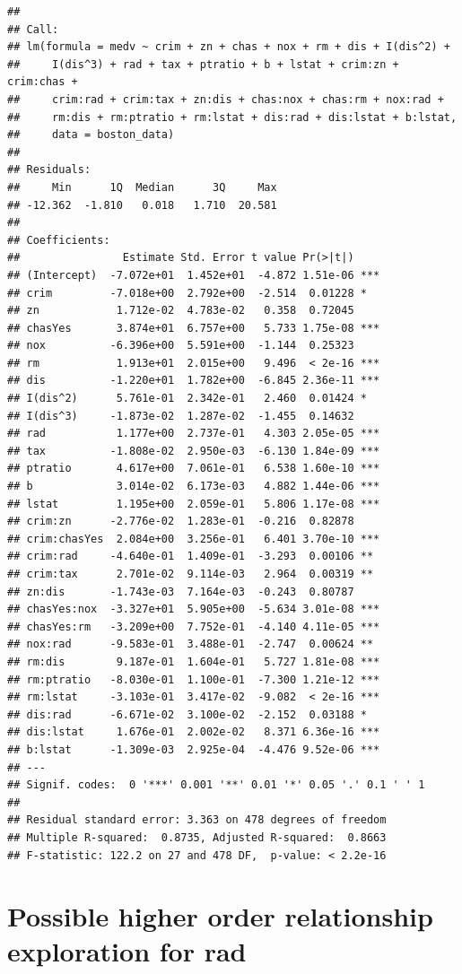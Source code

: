 \documentclass[
]{article}
\begin{document}
\begin{verbatim}
## 
## Call:
## lm(formula = medv ~ crim + zn + chas + nox + rm + dis + I(dis^2) + 
##     I(dis^3) + rad + tax + ptratio + b + lstat + crim:zn + crim:chas + 
##     crim:rad + crim:tax + zn:dis + chas:nox + chas:rm + nox:rad + 
##     rm:dis + rm:ptratio + rm:lstat + dis:rad + dis:lstat + b:lstat, 
##     data = boston_data)
## 
## Residuals:
##     Min      1Q  Median      3Q     Max 
## -12.362  -1.810   0.018   1.710  20.581 
## 
## Coefficients:
##                Estimate Std. Error t value Pr(>|t|)    
## (Intercept)  -7.072e+01  1.452e+01  -4.872 1.51e-06 ***
## crim         -7.018e+00  2.792e+00  -2.514  0.01228 *  
## zn            1.712e-02  4.783e-02   0.358  0.72045    
## chasYes       3.874e+01  6.757e+00   5.733 1.75e-08 ***
## nox          -6.396e+00  5.591e+00  -1.144  0.25323    
## rm            1.913e+01  2.015e+00   9.496  < 2e-16 ***
## dis          -1.220e+01  1.782e+00  -6.845 2.36e-11 ***
## I(dis^2)      5.761e-01  2.342e-01   2.460  0.01424 *  
## I(dis^3)     -1.873e-02  1.287e-02  -1.455  0.14632    
## rad           1.177e+00  2.737e-01   4.303 2.05e-05 ***
## tax          -1.808e-02  2.950e-03  -6.130 1.84e-09 ***
## ptratio       4.617e+00  7.061e-01   6.538 1.60e-10 ***
## b             3.014e-02  6.173e-03   4.882 1.44e-06 ***
## lstat         1.195e+00  2.059e-01   5.806 1.17e-08 ***
## crim:zn      -2.776e-02  1.283e-01  -0.216  0.82878    
## crim:chasYes  2.084e+00  3.256e-01   6.401 3.70e-10 ***
## crim:rad     -4.640e-01  1.409e-01  -3.293  0.00106 ** 
## crim:tax      2.701e-02  9.114e-03   2.964  0.00319 ** 
## zn:dis       -1.743e-03  7.164e-03  -0.243  0.80787    
## chasYes:nox  -3.327e+01  5.905e+00  -5.634 3.01e-08 ***
## chasYes:rm   -3.209e+00  7.752e-01  -4.140 4.11e-05 ***
## nox:rad      -9.583e-01  3.488e-01  -2.747  0.00624 ** 
## rm:dis        9.187e-01  1.604e-01   5.727 1.81e-08 ***
## rm:ptratio   -8.030e-01  1.100e-01  -7.300 1.21e-12 ***
## rm:lstat     -3.103e-01  3.417e-02  -9.082  < 2e-16 ***
## dis:rad      -6.671e-02  3.100e-02  -2.152  0.03188 *  
## dis:lstat     1.676e-01  2.002e-02   8.371 6.36e-16 ***
## b:lstat      -1.309e-03  2.925e-04  -4.476 9.52e-06 ***
## ---
## Signif. codes:  0 '***' 0.001 '**' 0.01 '*' 0.05 '.' 0.1 ' ' 1
## 
## Residual standard error: 3.363 on 478 degrees of freedom
## Multiple R-squared:  0.8735, Adjusted R-squared:  0.8663 
## F-statistic: 122.2 on 27 and 478 DF,  p-value: < 2.2e-16
\end{verbatim}

\section{Possible higher order relationship exploration for
rad}\label{possible-higher-order-relationship-exploration-for-rad}
\end{document}
